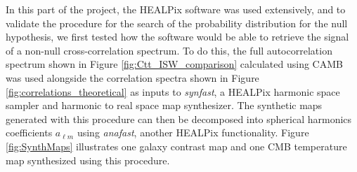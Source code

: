 \documentclass[openany,a4paper,12pt,oneside]{book}
\begin{document}
\begin{spacing}{1.5}
In this part of the project, the HEALPix software was used extensively, and to validate the procedure for the search of the probability distribution for the null hypothesis, we first tested how the software would be able to retrieve the signal of a non-null cross-correlation spectrum. To do this, the full autocorrelation spectrum shown in Figure \ref{fig:Ctt_ISW_comparison} calculated using CAMB was used alongside the correlation spectra shown in Figure \ref{fig:correlations_theoretical} as inputs to {\it synfast}, a HEALPix harmonic space sampler and harmonic to real space map synthesizer. The synthetic maps generated with this procedure can then be decomposed into spherical harmonics coefficients $a_{\ell m}$ using {\it anafast}, another HEALPix functionality. Figure \ref{fig:SynthMaps} illustrates one galaxy contrast map and one CMB temperature map synthesized using this procedure.


\end{spacing}
\end{document}
